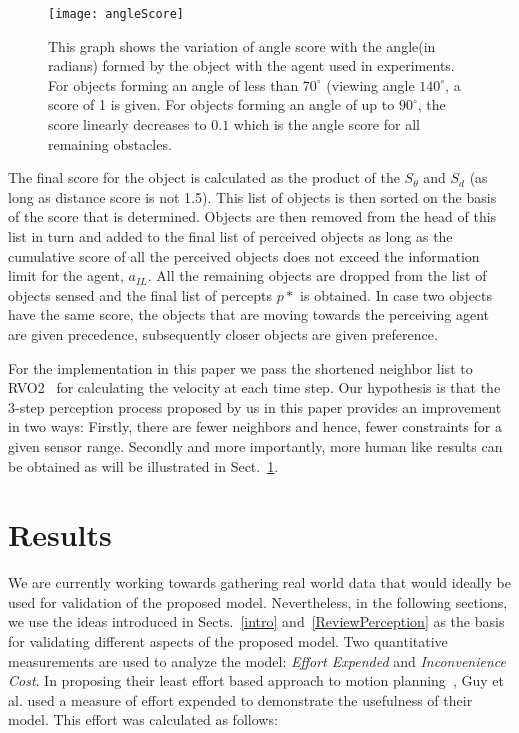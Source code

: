 \documentclass[runningheads,a4paper]{llncs}
\begin{document}
\begin{figure}[!b]
\centering
\texttt{[image: angleScore]}
\caption{This graph shows the variation of angle score with the angle(in radians) formed by the object with the agent used in experiments. For objects forming an angle of less than $70^{\circ}$ (viewing angle $140^{\circ}$, a score of 1 is given. For objects forming an angle of up to $90^{\circ}$, the score linearly decreases to $0.1$ which is the angle score for all remaining obstacles.}
\label{AngleScore}
\end{figure}

The final score for the object is calculated as the product of the $S_{\theta}$ and $S_d$ (as long as distance score is not 1.5). This list of objects is then sorted on the basis of the score that is determined. Objects are then removed from the head of this list in turn and added to the final list of perceived objects as long as the cumulative score of all the perceived objects does not exceed the information limit for the agent, $a_{IL}$. All the remaining objects are dropped from the list of objects sensed and the final list of percepts $p*$ is obtained. In case two objects have the same score, the objects that are moving towards the perceiving agent are given precedence, subsequently closer objects are given preference.

For the implementation in this paper we pass the shortened neighbor list to RVO2~\cite{Guy:2010ko} for calculating the velocity at each time step. Our hypothesis is that the 3-step perception process proposed by us in this paper provides an improvement in two ways: Firstly, there are fewer neighbors and hence, fewer constraints for a given sensor range. Secondly and more importantly, more human like results can be obtained as will be illustrated in Sect.~\ref{Results}.

\section{Results}
\label{Results}

We are currently working towards gathering real world data that would ideally be used for validation of the proposed model. Nevertheless, in the following sections, we use the ideas introduced in Sects.~\ref{intro} and~\ref{ReviewPerception} as the basis for validating different aspects of the proposed model. Two quantitative measurements are used to analyze the model: \emph{Effort Expended} and \emph{Inconvenience Cost}. In proposing their least effort based approach to motion planning~\cite{Guy:2010uv}, Guy et al. used a measure of effort expended to demonstrate the usefulness of their model. This effort was calculated as follows:
\end{document}
